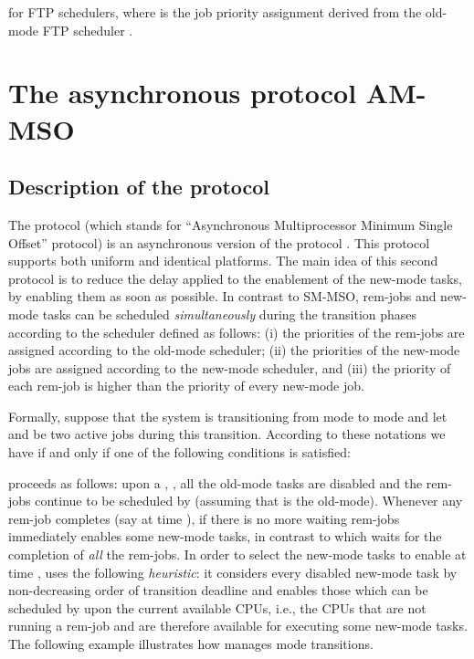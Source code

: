 \documentclass{article}
\newtheorem{validity test}{Validity Test}
\begin{document}
for FTP schedulers, where  is the job priority assignment derived from the old-mode FTP scheduler .




\section{The asynchronous protocol AM-MSO}
\label{sec:Multimode:AMMSO}

\subsection{Description of the protocol}
\label{sec:Multimode:AMMSO_description}

The protocol  (which stands for ``Asynchronous Multiprocessor Minimum Single Offset'' protocol) is an asynchronous version of the protocol . This protocol supports both uniform and identical platforms. The main idea of this second protocol is to reduce the delay applied to the enablement of the new-mode tasks, by enabling them as soon as possible. In contrast to SM-MSO, rem-jobs and new-mode tasks can be scheduled \emph{simultaneously} during the transition phases according to the scheduler  defined as follows: (i) the priorities of the rem-jobs are assigned according to the old-mode scheduler; (ii) the priorities of the new-mode jobs are assigned according to the new-mode scheduler, and (iii) the priority of each rem-job is higher than the priority of every new-mode job. 

Formally, suppose that the system is transitioning from mode  to mode  and let  and  be two active jobs during this transition. According to these notations we have  if and only if one of the following conditions is satisfied:


 proceeds as follows: upon a , , all the old-mode tasks are disabled and the rem-jobs continue to be scheduled by  (assuming that  is the old-mode). Whenever any rem-job completes (say at time ), if there is no more waiting rem-jobs  immediately enables some new-mode tasks, in contrast to  which waits for the completion of \emph{all} the rem-jobs. In order to select the new-mode tasks to enable at time ,  uses the following \emph{heuristic}: it considers every disabled new-mode task by non-decreasing order of transition deadline and enables those which can be scheduled by  upon the current available CPUs, i.e., the CPUs that are not running a rem-job and are therefore available for executing some new-mode tasks. The following example illustrates how  manages mode transitions.
\end{document}
